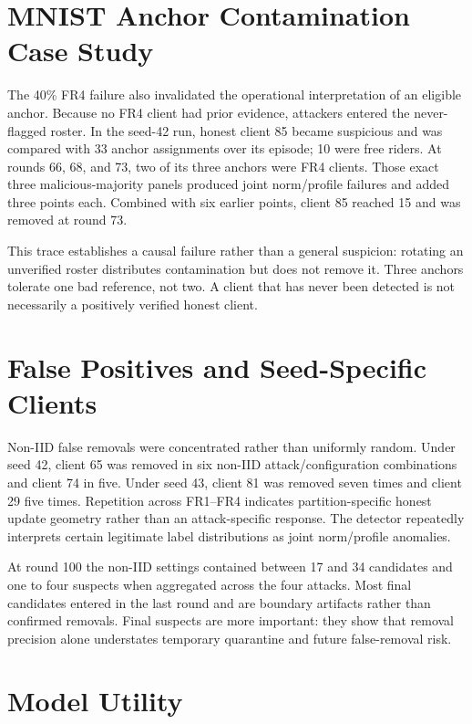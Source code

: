 \section{MNIST Anchor Contamination Case Study}

The 40\% FR4 failure also invalidated the operational interpretation of an eligible anchor. Because no FR4 client had prior evidence, attackers entered the never-flagged roster. In the seed-42 run, honest client 85 became suspicious and was compared with 33 anchor assignments over its episode; 10 were free riders. At rounds 66, 68, and 73, two of its three anchors were FR4 clients. Those exact three malicious-majority panels produced joint norm/profile failures and added three points each. Combined with six earlier points, client 85 reached 15 and was removed at round 73.

This trace establishes a causal failure rather than a general suspicion: rotating an unverified roster distributes contamination but does not remove it. Three anchors tolerate one bad reference, not two. A client that has never been detected is not necessarily a positively verified honest client.

\section{False Positives and Seed-Specific Clients}

Non-IID false removals were concentrated rather than uniformly random. Under seed 42, client 65 was removed in six non-IID attack/configuration combinations and client 74 in five. Under seed 43, client 81 was removed seven times and client 29 five times. Repetition across FR1--FR4 indicates partition-specific honest update geometry rather than an attack-specific response. The detector repeatedly interprets certain legitimate label distributions as joint norm/profile anomalies.

At round 100 the non-IID settings contained between 17 and 34 candidates and one to four suspects when aggregated across the four attacks. Most final candidates entered in the last round and are boundary artifacts rather than confirmed removals. Final suspects are more important: they show that removal precision alone understates temporary quarantine and future false-removal risk.

\section{Model Utility}

